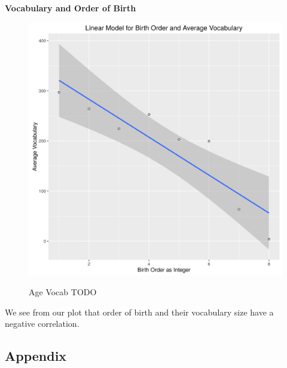 \documentclass[11pt]{article}  %
\begin{document}
\textbf{Vocabulary and Order of Birth}
\begin{figure}[h]
\centering
\caption{Age Vocab TODO}
\includegraphics[scale=.50]{means_orders}
\label{}
\end{figure}

\indent We see from our plot that order of birth and their vocabulary size have a negative correlation.






\newpage
\begin{center}
\appendix\section{Appendix}
\label{app}
\end{center}
\end{document}

